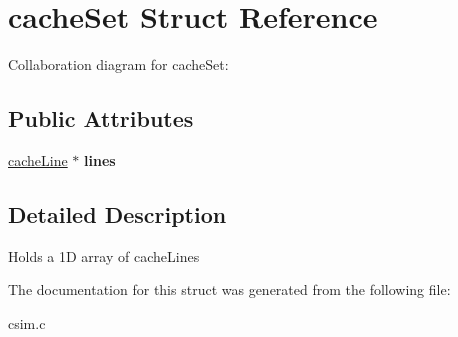 \hypertarget{structcacheSet}{}\section{cache\+Set Struct Reference}
\label{structcacheSet}


Collaboration diagram for cache\+Set\+:
\subsection*{Public Attributes}
\begin{DoxyCompactItemize}
\item 
\mbox{\label{structcacheSet_a1f272477296b23f4c4592eb1a7cb023d}} 
\hyperlink{structcacheLine}{cache\+Line} $\ast$ {\bfseries lines}
\end{DoxyCompactItemize}


\subsection{Detailed Description}
Holds a 1D array of cache\+Lines 

The documentation for this struct was generated from the following file\+:\begin{DoxyCompactItemize}
\item 
csim.\+c\end{DoxyCompactItemize}

